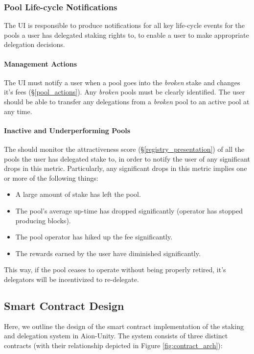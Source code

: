 \subsubsection{Pool Life-cycle Notifications}
The UI is responsible to produce notifications for all key life-cycle events for the pools a user has delegated staking rights to, to enable a user to make appropriate delegation decisions. 

\paragraph{Management Actions}
The UI must notify a user when a pool goes into the \textit{broken} stake and changes it's fees (\S\ref{pool_actions}). Any \textit{broken} pools must be clearly identified. The user should be able to transfer any delegations from a \textit{broken}  pool to an active pool at any time. 

\paragraph{Inactive and Underperforming Pools}
The should monitor the attractiveness score (\S\ref{registry_presentation}) of all the pools the user has delegated stake to, in order to notify the user of any significant drops in this metric. Particularly, any significant drops in this metric implies one or more of the following things: 
\begin{itemize}[label=--,nosep]
    \item A large amount of stake has left the pool.
    \item The pool's average up-time has dropped significantly (operator has stopped producing blocks). 
    \item The pool operator has hiked up the fee significantly. 
    \item The rewards earned by the user have diminished significantly. 
\end{itemize}

This way, if the pool ceases to operate without being properly retired, it's delegators will be incentivized to re-delegate. 


\subsection{Smart Contract Design} \label{sc_design}
Here, we outline the design of the smart contract implementation of the staking and delegation system in Aion-Unity. The system consists of three distinct contracts (with their relationship depicted in Figure \ref{fig:contract_arch}):

